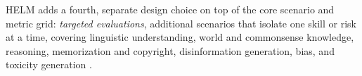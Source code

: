 HELM adds a fourth, separate design choice on top of the core scenario and metric grid: \emph{targeted evaluations}, additional scenarios that isolate one skill or risk at a time, covering linguistic understanding, world and commonsense knowledge, reasoning, memorization and copyright, disinformation generation, bias, and toxicity generation \cite{liangHolisticEvaluationLanguage2023}.

